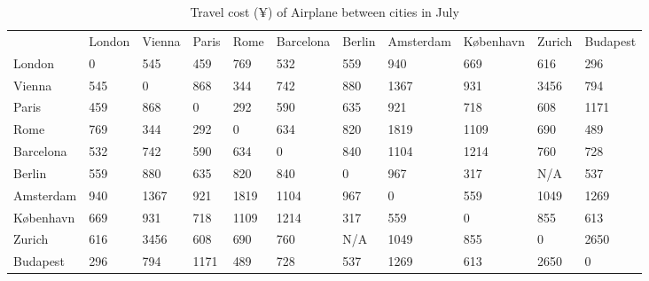 \documentclass{article} %
\begin{document}
\begin{table}[!ht]
  \centering
  \begin{tabular}{lllllllllll}

     & London & Vienna & Paris & Rome & Barcelona & Berlin & Amsterdam & København & Zurich & Budapest \\

  London & 0 & 545 & 459 & 769 & 532 & 559 & 940 & 669 & 616 & 296 \\

  Vienna & 545 & 0 & 868 & 344 & 742 & 880 & 1367 & 931 & 3456 & 794 \\

  Paris & 459 & 868 & 0 & 292 & 590 & 635 & 921 & 718 & 608 & 1171 \\

  Rome & 769 & 344 & 292 & 0 & 634 & 820 & 1819 & 1109 & 690 & 489 \\
  Barcelona & 532 & 742 & 590 & 634 & 0 & 840 & 1104 & 1214 & 760 & 728 \\
  Berlin & 559 & 880 & 635 & 820 & 840 & 0 & 967 & 317 & N/A & 537 \\
  Amsterdam & 940 & 1367 & 921 & 1819 & 1104 & 967 & 0 & 559 & 1049 & 1269 \\
  København & 669 & 931 & 718 & 1109 & 1214 & 317 & 559 & 0 & 855 & 613 \\
  Zurich & 616 & 3456 & 608 & 690 & 760 & N/A & 1049 & 855 & 0 & 2650 \\
  Budapest & 296 & 794 & 1171 & 489 & 728 & 537 & 1269 & 613 & 2650 & 0 \\
  \end{tabular}
  \caption{Travel cost (¥) of Airplane between cities in July}%
  \label{tab:costairplane}
\end{table}
\end{document}
